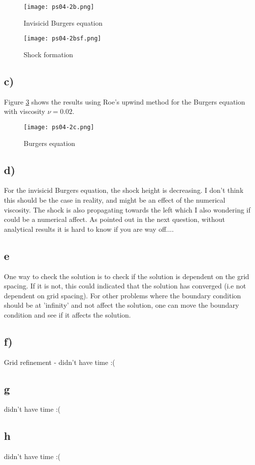 \documentclass{article}
\begin{document}
\begin{figure}
	\centering
	\texttt{[image: ps04-2b.png]}
	\caption{Invisicid Burgers equation}
	\label{fig:ib}
\end{figure}

\begin{figure}
	\centering
	\texttt{[image: ps04-2bsf.png]}
	\caption{Shock formation}
	\label{fig:shock}
\end{figure}

\subsection{c)}
Figure \ref{fig:b} shows the results using Roe's upwind method for the Burgers equation with viscosity $\nu = 0.02$. 

\begin{figure}
	\texttt{[image: ps04-2c.png]}
	\caption{Burgers equation}
	\label{fig:b}
\end{figure}

\subsection{d)}
For the invisicid Burgers equation, the shock height is decreasing. I don't think this should be the case in reality, and might be an effect of the numerical viscosity. The shock is also propagating towards the left which I also wondering if could be a numerical affect. As pointed out in the next question, without analytical results it is hard to know if you are way off....

\subsection{e}
One way to check the solution is to check if the solution is dependent on the grid spacing. If it is not, this could indicated that the solution has converged (i.e not dependent on grid spacing). For other problems where the boundary condition should be at 'infinity' and not affect the solution, one can move the boundary condition and see if it affects the solution.

\subsection{f)}
Grid refinement - didn't have time :(

\subsection{g}
didn't have time :(

\subsection{h}
didn't have time :(

\clearpage
\newpage

\end{document}
